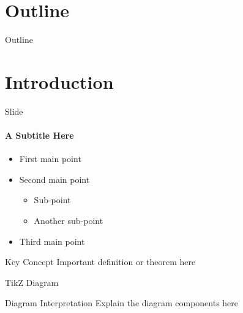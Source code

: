 \documentclass{beamer}
\begin{document}
\begin{frame}
    \titlepage
\end{frame}

\section*{Outline}
\begin{frame}[noframenumbering]{Outline}
    \tableofcontents
\end{frame}
\setcounter{section}{0}

\section{Introduction}

\begin{frame}{Slide}
    \framesubtitle{A Subtitle Here}

    \begin{itemize}
        \item First main point
        \item Second main point
              \begin{itemize}
                  \item Sub-point
                  \item Another sub-point
              \end{itemize}
        \item Third main point
    \end{itemize}

    \begin{block}{Key Concept}
        Important definition or theorem here
    \end{block}
\end{frame}

\begin{frame}{TikZ Diagram}
    \begin{center}
    \end{center}

    \begin{alertblock}{Diagram Interpretation}
        Explain the diagram components here
    \end{alertblock}
\end{frame}
\end{document}

